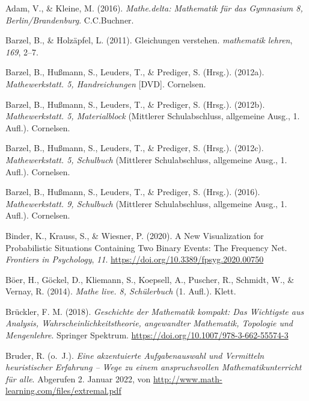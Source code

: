 \documentclass[
]{scrbook}
\newlength{\cslhangindent}
\newlength{\cslentryspacingunit} %
\newenvironment{CSLReferences}[2] %
 {%
  \setlength{\parindent}{0pt}
  \ifodd #1
  \let\oldpar\par
  \def\par{\hangindent=\cslhangindent\oldpar}
  \fi
  \setlength{\parskip}{#2\cslentryspacingunit}
 }%
 {}
\theoremstyle{definition}
\theoremstyle{definition}
\theoremstyle{definition}
\theoremstyle{definition}
\theoremstyle{remark}
\begin{document}
\hypertarget{refs}{}
\begin{CSLReferences}{1}{0}
\leavevmode{}%
Adam, V., \& Kleine, M. (2016). \emph{Mathe.delta: {Mathematik} für das {Gymnasium} 8, {Berlin}/{Brandenburg}}. C.C.Buchner.

\leavevmode{}%
Barzel, B., \& Holzäpfel, L. (2011). Gleichungen verstehen. \emph{mathematik lehren}, \emph{169}, 2--7.

\leavevmode{}%
Barzel, B., Hußmann, S., Leuders, T., \& Prediger, S. (Hrsg.). (2012a). \emph{Mathewerkstatt. 5, {Handreichungen}} {[}DVD{]}. Cornelsen.

\leavevmode{}%
Barzel, B., Hußmann, S., Leuders, T., \& Prediger, S. (Hrsg.). (2012b). \emph{Mathewerkstatt. 5, {Materialblock}} (Mittlerer Schulabschluss, allgemeine Ausg., 1. Aufl.). Cornelsen.

\leavevmode{}%
Barzel, B., Hußmann, S., Leuders, T., \& Prediger, S. (Hrsg.). (2012c). \emph{Mathewerkstatt. 5, {Schulbuch}} (Mittlerer Schulabschluss, allgemeine Ausg., 1. Aufl.). Cornelsen.

\leavevmode{}%
Barzel, B., Hußmann, S., Leuders, T., \& Prediger, S. (Hrsg.). (2016). \emph{Mathewerkstatt. 9, {Schulbuch}} (Mittlerer Schulabschluss, allgemeine Ausg., 1. Aufl.). Cornelsen.

\leavevmode{}%
Binder, K., Krauss, S., \& Wiesner, P. (2020). A {New} {Visualization} for {Probabilistic} {Situations} {Containing} {Two} {Binary} {Events}: {The} {Frequency} {Net}. \emph{Frontiers in Psychology}, \emph{11}. \url{https://doi.org/10.3389/fpsyg.2020.00750}

\leavevmode{}%
Böer, H., Göckel, D., Kliemann, S., Koepsell, A., Puscher, R., Schmidt, W., \& Vernay, R. (2014). \emph{Mathe live. 8, {Schülerbuch}} (1. Aufl.). Klett.

\leavevmode{}%
Brückler, F. M. (2018). \emph{Geschichte der {Mathematik} kompakt: {Das} {Wichtigste} aus {Analysis}, {Wahrscheinlichkeitstheorie}, angewandter {Mathematik}, {Topologie} und {Mengenlehre}}. Springer Spektrum. \url{https://doi.org/10.1007/978-3-662-55574-3}

\leavevmode{}%
Bruder, R. (o.~J.). \emph{Eine akzentuierte {Aufgabenauswahl} und {Vermitteln} heuristischer {Erfahrung} -- {Wege} zu einem anspruchsvollen {Mathematikunterricht} für alle}. Abgerufen 2. Januar 2022, von \url{http://www.math-learning.com/files/extremal.pdf}


\end{CSLReferences}
\end{document}
